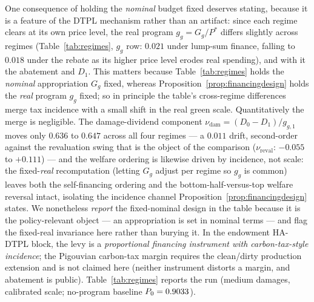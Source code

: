 \documentclass[12pt]{article}
\begin{document}
One consequence of holding the \emph{nominal} budget fixed deserves stating,
because it is a feature of the DTPL mechanism rather than an artifact: since
each regime clears at its own price level, the real program $g_g=G_g/P^{*}$
differs slightly across regimes (Table~\ref{tab:regimes}, $g_g$ row: $0.021$
under lump-sum finance, falling to $0.018$ under the rebate as its higher
price level erodes real spending), and with it the abatement and $D_1$. This
matters because Table~\ref{tab:regimes} holds the \emph{nominal} appropriation
$G_g$ fixed, whereas Proposition~\ref{prop:financingdesign} holds the
\emph{real} program $g_g$ fixed; so in principle the table's cross-regime
differences merge tax incidence with a small shift in the real green scale.
Quantitatively the merge is negligible. The damage-dividend component
$\nu_{\mathrm{dam}} = (D_0-D_1)/g_{g,1}$ moves only $0.636$ to $0.647$ across
all four regimes --- a $0.011$ drift, second-order against the
revaluation swing that is the object of the comparison ($\nu_{\mathrm{reval}}$:
$-0.055$ to $+0.111$) --- and the welfare ordering is likewise driven by
incidence, not scale: the fixed-\emph{real} recomputation (letting $G_g$ adjust
per regime so $g_g$ is common) leaves both the self-financing ordering and the
bottom-half-versus-top welfare reversal intact, isolating the incidence channel
Proposition~\ref{prop:financingdesign} states. We nonetheless \emph{report} the
fixed-nominal design in the table because it is the policy-relevant object ---
an appropriation is set in nominal terms --- and flag the fixed-real invariance
here rather than burying it. In the
endowment HA-DTPL block, the levy is a \emph{proportional
financing instrument with carbon-tax-style incidence}; the Pigouvian
carbon-tax margin requires the clean/dirty production extension and is not
claimed here (neither instrument distorts a margin, and abatement is public).
Table~\ref{tab:regimes} reports the run (medium damages, calibrated scale;
no-program baseline $P_0 = 0.9033$).
\end{document}
